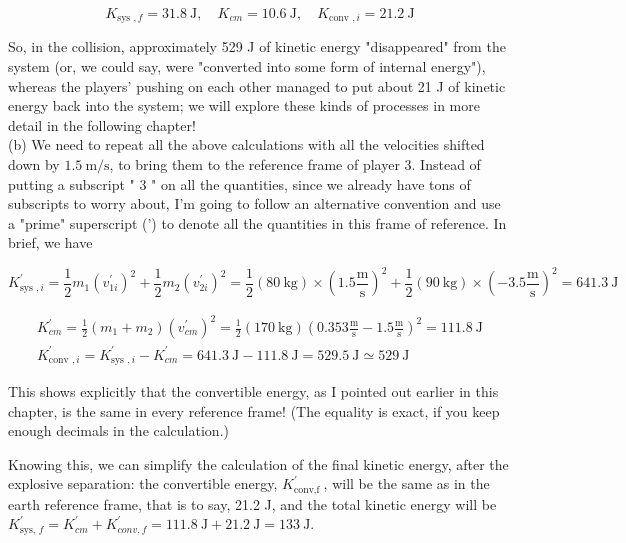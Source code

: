 \documentclass[10pt]{article}
\begin{document}
$$
K_{\text {sys }, f}=31.8 \mathrm{~J}, \quad K_{c m}=10.6 \mathrm{~J}, \quad K_{\text {conv }, i}=21.2 \mathrm{~J}
$$

So, in the collision, approximately 529 J of kinetic energy "disappeared" from the system (or, we could say, were "converted into some form of internal energy"), whereas the players' pushing on each other managed to put about 21 J of kinetic energy back into the system; we will explore these kinds of processes in more detail in the following chapter!\\
(b) We need to repeat all the above calculations with all the velocities shifted down by $1.5 \mathrm{~m} / \mathrm{s}$, to bring them to the reference frame of player 3. Instead of putting a subscript " 3 " on all the quantities, since we already have tons of subscripts to worry about, I'm going to follow an alternative convention and use a "prime" superscript (') to denote all the quantities in this frame of reference. In brief, we have


\begin{equation*}
K_{\text {sys }, i}^{\prime}=\frac{1}{2} m_{1}\left(v_{1 i}^{\prime}\right)^{2}+\frac{1}{2} m_{2}\left(v_{2 i}^{\prime}\right)^{2}=\frac{1}{2}(80 \mathrm{~kg}) \times\left(1.5 \frac{\mathrm{m}}{\mathrm{s}}\right)^{2}+\frac{1}{2}(90 \mathrm{~kg}) \times\left(-3.5 \frac{\mathrm{m}}{\mathrm{s}}\right)^{2}=641.3 \mathrm{~J} \tag{4.25}
\end{equation*}



\begin{gather*}
K_{c m}^{\prime}=\frac{1}{2}\left(m_{1}+m_{2}\right)\left(v_{c m}^{\prime}\right)^{2}=\frac{1}{2}(170 \mathrm{~kg})\left(0.353 \frac{\mathrm{m}}{\mathrm{s}}-1.5 \frac{\mathrm{m}}{\mathrm{s}}\right)^{2}=111.8 \mathrm{~J}  \tag{4.26}\\
K_{\text {conv }, i}^{\prime}=K_{\text {sys }, i}^{\prime}-K_{c m}^{\prime}=641.3 \mathrm{~J}-111.8 \mathrm{~J}=529.5 \mathrm{~J} \simeq 529 \mathrm{~J} \tag{4.27}
\end{gather*}


This shows explicitly that the convertible energy, as I pointed out earlier in this chapter, is the same in every reference frame! (The equality is exact, if you keep enough decimals in the calculation.)

Knowing this, we can simplify the calculation of the final kinetic energy, after the explosive separation: the convertible energy, $K_{\text {conv,f }}^{\prime}$, will be the same as in the earth reference frame, that is to say, 21.2 J, and the total kinetic energy will be $K_{\text {sys, } f}^{\prime}=K_{c m}^{\prime}+K_{c o n v, f}^{\prime}=111.8 \mathrm{~J}+21.2 \mathrm{~J}=133 \mathrm{~J}$.
\end{document}
